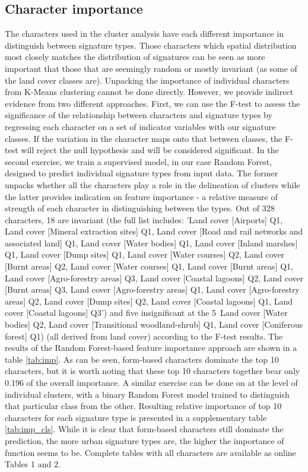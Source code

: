 \documentclass[fleqn,10pt]{wlscirep}
\begin{document}
\subsection*{Character importance}
The characters used in the cluster analysis have each different importance in distinguish between signature types.
Those characters which spatial distribution most closely matches the distribution of signatures
can be seen as more important that those that are seemingly random or mostly invariant (as some of the land cover classes are).
Unpacking the importance of individual characters from K-Means clustering cannot be done directly. However,
we provide indirect evidence from two different approaches. First, we can use the F-test to assess the significance of the relationship between characters and signature types by regressing each character on a set of indicator variables with our signature classes. If the variation in the character maps onto that between classes, the F-test will reject the null hypothesis and will be considered significant. In the second exercise, we
train a supervised model, in our case Random Forest, designed to predict individual
signature types from input data. The former unpacks whether all the characters play a role
in the delineation of clusters while the latter provides indication on feature importance - a relative measure of
strength of each character in distinguishing between the types. Out of 328 characters,
18 are invariant (the full list includes: 'Land cover [Airports] Q1, Land cover [Mineral extraction
sites] Q1, Land cover [Road and rail networks and associated land] Q1, Land cover [Water
bodies] Q1, Land cover [Inland marshes] Q1, Land cover [Dump sites] Q1, Land cover
[Water courses] Q2, Land cover [Burnt areas] Q2, Land cover [Water courses] Q1, Land
cover [Burnt areas] Q1, Land cover [Agro-forestry areas] Q3, Land cover [Coastal
lagoons] Q2, Land cover [Burnt areas] Q3, Land cover [Agro-forestry areas] Q1, Land
cover [Agro-forestry areas] Q2, Land cover [Dump sites] Q2, Land cover [Coastal lagoons]
Q1, Land cover [Coastal lagoons] Q3')
and five insignificant at the 5\
Land cover [Water bodies] Q2, Land cover [Transitional woodland-shrub] Q1, Land cover [Coniferous forest] Q1)
(all derived from land cover) according to the F-test results. The results of
the Random Forest-based feature importance approach are shown in
a table \ref{tab:imp}. As can be seen, form-based characters dominate the top 10 characters, but it is worth
noting that these top 10 characters together bear only 0.196 of the overall importance.
A similar exercise can be done on at the level of individual clusters, with a binary Random Forest model trained
to distinguish that particular class from the other. Resulting relative importance of top 10 characters for each signature type
is presented in a supplementary table \ref{tab:imp_cls}. While it is clear that form-based characters still dominate the prediction,
the more urban signature types are, the higher the importance of function seems to be. Complete tables
with all characters are available as online Tables 1 and 2.
\end{document}
